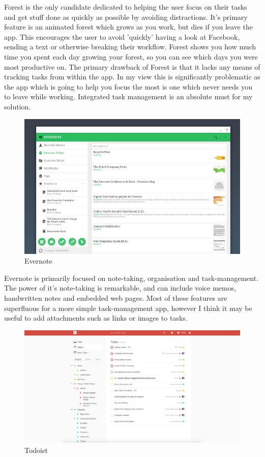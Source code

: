 \documentclass{article}
\begin{document}
Forest is the only candidate dedicated to helping the user focus on their tasks
and get stuff done as quickly as possible by avoiding distractions. It's primary
feature is an animated forest which grows as you work, but dies if you leave the
app. This encourages the user to avoid 'quickly' having a look at Facebook,
sending a text or otherwise breaking their workflow. Forest shows you how much
time you spent each day growing your forest, so you can see which days you were
most productive on. The primary drawback of Forest is that it lacks any means of
tracking tasks from within the app. In my view this is significantly
problematic as the app which is going to help you focus the most is one which
never needs you to leave while working. Integrated task management is an
absolute must for my solution.\\

\begin{figure}[h!]
  \includegraphics[width=\linewidth]{Images/evernote.jpg}
  \caption{Evernote}
  \label{fig:evernote1}
\end{figure}

Evernote is primarily focused on note-taking, organisation and task-management.
The power of it's note-taking is remarkable, and can include voice memos,
handwritten notes and embedded web pages. Most of these features are superfluous
for a more simple task-management app, however I think it may be useful to add
attachments such as links or images to tasks.\\ 

\begin{figure}[h!]
  \includegraphics[width=\linewidth]{Images/todoist.png}
  \caption{Todoist}
  \label{fig:todoist1}
\end{figure}
\end{document}
